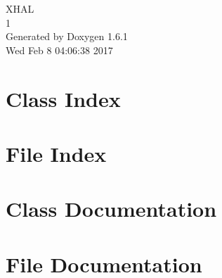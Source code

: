 \documentclass[a4paper]{book}
\begin{document}
\hypersetup{pageanchor=false}
\begin{titlepage}
\vspace*{7cm}
\begin{center}
{\Large XHAL \\[1ex]\large 1 }\\
\vspace*{1cm}
{\large Generated by Doxygen 1.6.1}\\
\vspace*{0.5cm}
{\small Wed Feb 8 04:06:38 2017}\\
\end{center}
\end{titlepage}
\clearemptydoublepage
{}
\tableofcontents
\clearemptydoublepage
{}
\hypersetup{pageanchor=true}
\chapter{Class Index}

\chapter{File Index}

\chapter{Class Documentation}











\chapter{File Documentation}



\printindex
\end{document}
